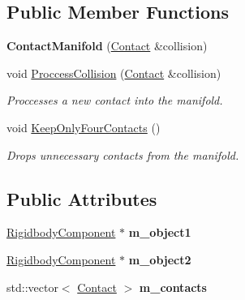 \subsection*{Public Member Functions}
\begin{DoxyCompactItemize}
\item 
\mbox{\label{classContactManifold_a5f97e21f2f679383c0484fb03064d4ac}} 
{\bfseries Contact\+Manifold} (\hyperlink{classContact}{Contact} \&collision)
\item 
void \hyperlink{classContactManifold_ab435616e119010a5904ff0833519bf52}{Proccess\+Collision} (\hyperlink{classContact}{Contact} \&collision)
\begin{DoxyCompactList}\small\item\em Proccesses a new contact into the manifold. \end{DoxyCompactList}\item 
\mbox{\label{classContactManifold_a6fdcb82f3b35f2d9e7f5d6710a6c3119}} 
void \hyperlink{classContactManifold_a6fdcb82f3b35f2d9e7f5d6710a6c3119}{Keep\+Only\+Four\+Contacts} ()
\begin{DoxyCompactList}\small\item\em Drops unnecessary contacts from the manifold. \end{DoxyCompactList}\end{DoxyCompactItemize}
\subsection*{Public Attributes}
\begin{DoxyCompactItemize}
\item 
\mbox{\label{classContactManifold_a38bf798af49f4baf9d93776b598cc437}} 
\hyperlink{classRigidbodyComponent}{Rigidbody\+Component} $\ast$ {\bfseries m\+\_\+object1}
\item 
\mbox{\label{classContactManifold_a5642b4bfd7ba7adac716f9d48b4a8e6b}} 
\hyperlink{classRigidbodyComponent}{Rigidbody\+Component} $\ast$ {\bfseries m\+\_\+object2}
\item 
\mbox{\label{classContactManifold_ad70b47677c91962e00b27d8e30dacade}} 
std\+::vector$<$ \hyperlink{classContact}{Contact} $>$ {\bfseries m\+\_\+contacts}
\end{DoxyCompactItemize}


